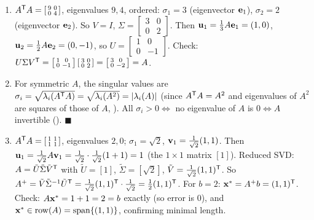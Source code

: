 \begin{enumerate}[label=\textbf{7.\arabic*},leftmargin=2.6em,itemsep=8pt]
\item $A^{\mathsf{T}} A=\left[\begin{smallmatrix}9&0\\0&4\end{smallmatrix}\right]$, eigenvalues $9,4$, ordered: $\sigma_1=3$ (eigenvector $\mathbf{e}_1$), $\sigma_2=2$ (eigenvector $\mathbf{e}_2$). So $V=I$, $\Sigma=\left[\begin{smallmatrix}3&0\\0&2\end{smallmatrix}\right]$. Then $\mathbf{u}_1=\tfrac13A\mathbf{e}_1=(1,0)$, $\mathbf{u}_2=\tfrac12A\mathbf{e}_2=(0,-1)$, so $U=\left[\begin{smallmatrix}1&0\\0&-1\end{smallmatrix}\right]$. Check: $U\Sigma V^{\mathsf{T}}=\left[\begin{smallmatrix}1&0\\0&-1\end{smallmatrix}\right]\left[\begin{smallmatrix}3&0\\0&2\end{smallmatrix}\right]=\left[\begin{smallmatrix}3&0\\0&-2\end{smallmatrix}\right]=A$. \checkmark

\item For symmetric $A$, the singular values are $\sigma_i=\sqrt{\lambda_i(A^{\mathsf{T}} A)}=\sqrt{\lambda_i(A^2)}=\lvert \lambda_i(A) \rvert$ (since $A^{\mathsf{T}} A=A^2$ and eigenvalues of $A^2$ are squares of those of $A$, ). All $\sigma_i>0\iff$ no eigenvalue of $A$ is $0\iff A$ invertible (). $\blacksquare$

\item $A^{\mathsf{T}} A=\left[\begin{smallmatrix}1&1\\1&1\end{smallmatrix}\right]$, eigenvalues $2,0$; $\sigma_1=\sqrt2$, $\mathbf{v}_1=\tfrac1{\sqrt2}(1,1)$. Then $\mathbf{u}_1=\tfrac1{\sqrt2}A\mathbf{v}_1=\tfrac1{\sqrt2}\cdot\tfrac1{\sqrt2}(1+1)=1$ (the $1\times1$ matrix $[1]$). Reduced SVD: $A=\tilde U\tilde\Sigma\tilde V^{\mathsf{T}}$ with $\tilde U=[1]$, $\tilde\Sigma=[\sqrt2]$, $\tilde V=\tfrac1{\sqrt2}(1,1)^{\mathsf{T}}$. So $A^+=\tilde V\tilde\Sigma^{-1}\tilde U^{\mathsf{T}}=\tfrac1{\sqrt2}(1,1)^{\mathsf{T}}\cdot\tfrac1{\sqrt2}=\tfrac12(1,1)^{\mathsf{T}}$. For $b=2$: $\mathbf{x}^*=A^+b=(1,1)^{\mathsf{T}}$. Check: $A\mathbf{x}^*=1+1=2=b$ exactly (so error is $0$), and $\mathbf{x}^*\in\operatorname{row}(A)=\operatorname{span}\{(1,1)\}$, confirming minimal length. \checkmark

\end{enumerate}
